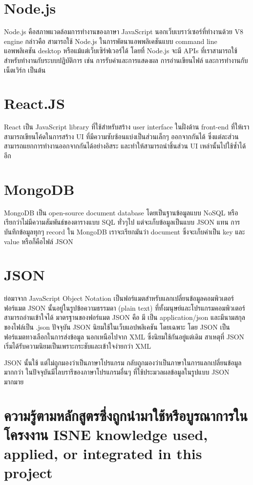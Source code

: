 \section{Node.js}
Node.js คือสภาพแวดล้อมการทำงานของภาษา JavaScript นอกเว็บเบราว์เซอร์ที่ทำงานด้วย V8 engine กล่าวคือ สามารถใช้ Node.js ในการพัตนาแอพพลิเคชันแบบ command line แอพพลิเคชัน desktop หรือแม้แต่เว็บเซิร์ฟเวอร์ได้ 
โดยที่ Node.js จะมี APIs ที่เราสามารถใช้สำหรับทำงานกับระบบปฏิบัติการ เช่น การรับค่าและการแสดงผล การอ่านเขียนไฟล์ และการทำงานกับเน็ตเวิร์ก เป็นต้น

\section{React.JS}
React เป็น JavaScript library ที่ใช้สำหรับสร้าง user interface ในฝั่งด้าน front-end ที่ให้เราสามารถเขียนโค้ดในการสร้าง UI ที่มีความซับซ้อนแบ่งเป็นส่วนเล็กๆ ออกจากกันได้ ซึ่งแต่ละส่วนสามารถแยกการทำงานออกจากกันได้อย่างอิสระ 
และทำให้สามารถนำชิ้นส่วน UI เหล่านั้นไปใช้ซ้ำได้อีก

\section{MongoDB}
MongoDB เป็น open-source document database โดยเป็นฐานข้อมูลแบบ NoSQL หรือเรียกว่าไม่มีความสัมพันธ์ของตารางแบบ SQL ทั่วๆไป แต่จะเก็บข้อมูลเป็นแบบ JSON แทน การบันทึกข้อมูลทุกๆ record ใน MongoDB 
เราจะเรียกมันว่า document ซึ่งจะเก็บค่าเป็น key และ value หรือก็คือไฟล์ JSON

\section{JSON}
ย่อมาจาก JavaScript Object Notation เป็นฟอร์แมตสำหรับแลกเปลี่ยนข้อมูลคอมพิวเตอร์
ฟอร์แมต JSON นั้นอยู่ในรูปข้อความธรรมดา (plain text) ที่ทั้งมนุษย์และโปรแกรมคอมพิวเตอร์สามารถอ่านเข้าใจได้ 
มาตรฐานของฟอร์แมต JSON คือ  มี  เป็น application/json และมีนามสกุลของไฟล์เป็น .json
ปัจจุบัน JSON นิยมใช้ในเว็บแอปพลิเคชัน โดยเฉพาะ  โดย JSON เป็นฟอร์แมตทางเลือกในการส่งข้อมูล นอกเหนือไปจาก XML ซึ่งนิยมใช้กันอยู่แต่เดิม สาเหตุที่ JSON เริ่มได้รับความนิยมเป็นเพราะกระชับและเข้าใจง่ายกว่า XML

JSON นั้นใช้ แต่ไม่ถูกมองว่าเป็นภาษาโปรแกรม กลับถูกมองว่าเป็นภาษาในการแลกเปลี่ยนข้อมูลมากกว่า ในปัจจุบันมีไลบรารีของภาษาโปรแกรมอื่นๆ ที่ใช้ประมวลผลข้อมูลในรูปแบบ JSON มากมาย

\section{\ifcpe%
ความรู้ตามหลักสูตรซึ่งถูกนำมาใช้หรือบูรณาการในโครงงาน
\else%
ISNE knowledge used, applied, or integrated in this project
\fi
}
